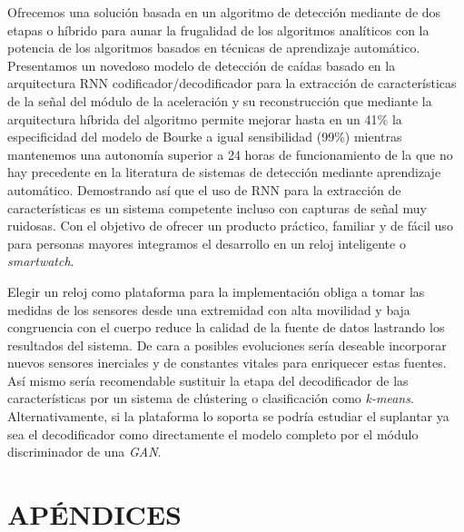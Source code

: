 \documentclass[11pt,a4paper,spanish,twocolumn]{article}
\begin{document}
Ofrecemos una solución basada en un algoritmo de detección mediante de dos etapas o híbrido para aunar la frugalidad de los algoritmos analíticos con la potencia de los algoritmos basados en técnicas de aprendizaje automático. Presentamos un novedoso modelo de detección de caídas basado en la arquitectura RNN codificador/decodificador para la extracción de características de la señal del módulo de la aceleración y su reconstrucción que mediante la arquitectura híbrida del algoritmo permite mejorar hasta en un 41\% la especificidad del modelo de Bourke a igual sensibilidad (99\%) mientras mantenemos una autonomía superior a 24 horas de funcionamiento de la que no hay precedente en la literatura de sistemas de detección mediante aprendizaje automático. Demostrando así que el uso de RNN para la extracción de características es un sistema competente incluso con capturas de señal muy ruidosas. Con el objetivo de ofrecer un producto práctico, familiar y de fácil uso para personas mayores integramos el desarrollo en un reloj inteligente o \textit{smartwatch}.


Elegir un reloj  como plataforma para la implementación obliga a tomar las medidas de los sensores desde una extremidad con alta movilidad y baja congruencia con el cuerpo reduce la calidad de la fuente de datos lastrando los resultados del sistema. De cara a posibles evoluciones sería deseable incorporar nuevos sensores inerciales y de constantes vitales para enriquecer estas fuentes. Así mismo sería recomendable sustituir la etapa del decodificador de las características por un sistema de clústering o clasificación como \textit{k-means}. Alternativamente, si la plataforma lo soporta se podría estudiar el suplantar ya sea el decodificador como directamente el modelo completo por el módulo discriminador de una \textit{GAN}.

\appendix
\section{APÉNDICES}



\end{document}
